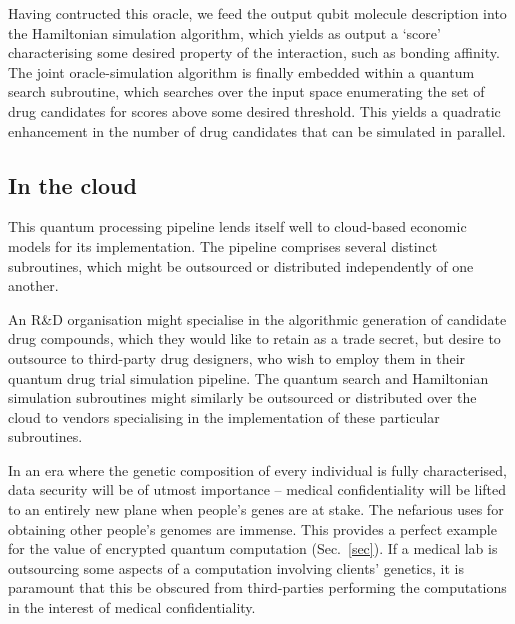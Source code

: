 Having contructed this oracle, we feed the output qubit molecule description into the Hamiltonian simulation algorithm, which yields as output a `score' characterising some desired property of the interaction, such as bonding affinity. The joint oracle-simulation algorithm is finally embedded within a quantum search subroutine, which searches over the input space enumerating the set of drug candidates for scores above some desired threshold. This yields a quadratic enhancement in the number of drug candidates that can be simulated in parallel.

%
%

\subsection{In the cloud}

This quantum processing pipeline lends itself well to cloud-based economic models for its implementation. The pipeline comprises several distinct subroutines, which might be outsourced or distributed independently of one another.

An R\&D organisation might specialise in the algorithmic generation of candidate drug compounds, which they would like to retain as a trade secret, but desire to outsource to third-party drug designers, who wish to employ them in their quantum drug trial simulation pipeline. The quantum search and Hamiltonian simulation subroutines might similarly be outsourced or distributed over the cloud to vendors specialising in the implementation of these particular subroutines.

In an era where the genetic composition of every individual is fully characterised, data security will be of utmost importance -- medical confidentiality will be lifted to an entirely new plane when people's genes are at stake. The nefarious uses for obtaining other people's genomes are immense. This provides a perfect example for the value of encrypted quantum computation (Sec.~\ref{sec}). If a medical lab is outsourcing some aspects of a computation involving clients' genetics, it is paramount that this be obscured from third-parties performing the computations in the interest of medical confidentiality. 
